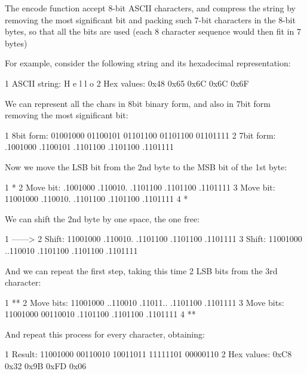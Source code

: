 The encode function accept 8-\/bit A\+S\+C\+II characters, and compress the string by removing the most significant bit and packing such 7-\/bit characters in the 8-\/bit bytes, so that all the bits are used (each 8 character sequence would then fit in 7 bytes)

For example, consider the following string and it\textquotesingle{}s hexadecimal representation\+:


\begin{DoxyCode}
1 ASCII string: H    e    l    l    o   
2   Hex values: 0x48 0x65 0x6C 0x6C 0x6F    
\end{DoxyCode}


We can represent all the chars in 8bit binary form, and also in 7bit form removing the most significant bit\+:


\begin{DoxyCode}
1 8bit form: 01001000 01100101 01101100 01101100 01101111
2 7bit form: .1001000 .1100101 .1101100 .1101100 .1101111
\end{DoxyCode}


Now we move the L\+SB bit from the 2nd byte to the M\+SB bit of the 1st byte\+:


\begin{DoxyCode}
1                           *
2 Move bit: .1001000 .110010. .1101100 .1101100 .1101111
3 Move bit: 11001000 .110010. .1101100 .1101100 .1101111
4           *
\end{DoxyCode}


We can shift the 2nd byte by one space, the one free\+:


\begin{DoxyCode}
1                  ------>
2 Shift: 11001000 .110010. .1101100 .1101100 .1101111
3 Shift: 11001000 ..110010 .1101100 .1101100 .1101111
\end{DoxyCode}


And we can repeat the first step, taking this time 2 L\+SB bits from the 3rd character\+:


\begin{DoxyCode}
1                                    **
2 Move bits: 11001000 ..110010 .11011.. .1101100 .1101111
3 Move bits: 11001000 00110010 .1101100 .1101100 .1101111
4                     **
\end{DoxyCode}


And repeat this process for every character, obtaining\+:


\begin{DoxyCode}
1     Result: 11001000 00110010 10011011 11111101 00000110
2 Hex values: 0xC8     0x32     0x9B     0xFD     0x06
\end{DoxyCode}
 